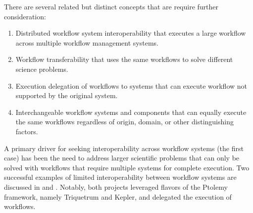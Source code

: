 There are several related but distinct concepts that are require further
consideration:


\begin{enumerate}
\item Distributed workflow system interoperability that executes a
large workflow across multiple workflow management systems. 
\item Workflow transferability that uses the same workflows to solve different
science problems.
\item Execution delegation of workflows to systems that can execute workflow
not supported by the original system. 
\item Interchangeable workflow systems and components that can
equally execute the same workflows regardless of origin, domain,
or other distinguishing factors.
\end{enumerate} 

A primary driver for seeking interoperability across workflow systems (the
first case) has been the need to address larger scientific problems that can
only be solved with workflows that require multiple systems for complete execution.
Two successful examples of limited interoperability between workflow systems
are discussed in \cite{brooks_triquetrum:_2015} and
\cite{mandal_integrating_2007}. Notably, both projects leveraged flavors of
the Ptolemy framework, namely Triquetrum and Kepler, and delegated the
execution of workflows. 
